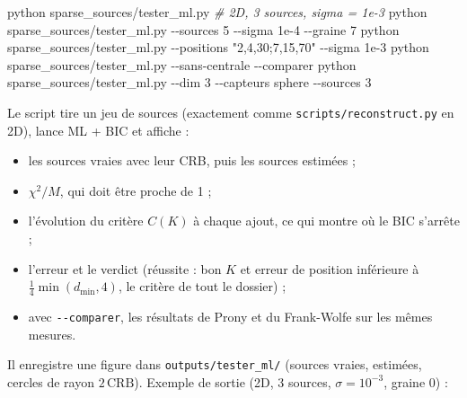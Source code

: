 \documentclass[
  french,
]{article}
\newenvironment{Shaded}{}{}
\newcommand{\AttributeTok}[1]{\textcolor[rgb]{0.49,0.56,0.16}{#1}}
\newcommand{\CommentTok}[1]{\textcolor[rgb]{0.38,0.63,0.69}{\textit{#1}}}
\newcommand{\ExtensionTok}[1]{#1}
\newcommand{\NormalTok}[1]{#1}
\newcommand{\StringTok}[1]{\textcolor[rgb]{0.25,0.44,0.63}{#1}}
\providecommand{\tightlist}{%
  \setlength{\itemsep}{0pt}\setlength{\parskip}{0pt}}
\begin{document}
\begin{Shaded}
\begin{Highlighting}[]
\ExtensionTok{python}\NormalTok{ sparse\_sources/tester\_ml.py                          }\CommentTok{\# 2D, 3 sources, sigma = 1e{-}3}
\ExtensionTok{python}\NormalTok{ sparse\_sources/tester\_ml.py }\AttributeTok{{-}{-}sources}\NormalTok{ 5 }\AttributeTok{{-}{-}sigma}\NormalTok{ 1e{-}4 }\AttributeTok{{-}{-}graine}\NormalTok{ 7}
\ExtensionTok{python}\NormalTok{ sparse\_sources/tester\_ml.py }\AttributeTok{{-}{-}positions} \StringTok{"2,4,30;7,15,70"} \AttributeTok{{-}{-}sigma}\NormalTok{ 1e{-}3}
\ExtensionTok{python}\NormalTok{ sparse\_sources/tester\_ml.py }\AttributeTok{{-}{-}sans{-}centrale} \AttributeTok{{-}{-}comparer}
\ExtensionTok{python}\NormalTok{ sparse\_sources/tester\_ml.py }\AttributeTok{{-}{-}dim}\NormalTok{ 3 }\AttributeTok{{-}{-}capteurs}\NormalTok{ sphere }\AttributeTok{{-}{-}sources}\NormalTok{ 3}
\end{Highlighting}
\end{Shaded}

Le script tire un jeu de sources (exactement comme
\texttt{scripts/reconstruct.py} en 2D), lance ML + BIC et affiche :

\begin{itemize}
\tightlist
\item
  les sources vraies avec leur CRB, puis les sources estimées ;
\item
  \(\chi^2/M\), qui doit être proche de 1 ;
\item
  l'évolution du critère \(C(K)\) à chaque ajout, ce qui montre où le
  BIC s'arrête ;
\item
  l'erreur et le verdict (réussite : bon \(K\) et erreur de position
  inférieure à \(\tfrac14\min(d_{\min}, 4)\), le critère de tout le
  dossier) ;
\item
  avec \texttt{-\/-comparer}, les résultats de Prony et du Frank-Wolfe
  sur les mêmes mesures.
\end{itemize}

Il enregistre une figure dans \texttt{outputs/tester\_ml/} (sources
vraies, estimées, cercles de rayon \(2\,\mathrm{CRB}\)). Exemple de
sortie (2D, 3 sources, \(\sigma = 10^{-3}\), graine 0) :
\end{document}

